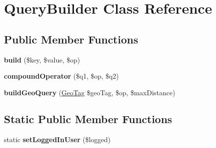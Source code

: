 \hypertarget{class_query_builder}{\section{Query\+Builder Class Reference}
\label{class_query_builder}
}
\subsection*{Public Member Functions}
\begin{DoxyCompactItemize}
\item 
\hypertarget{class_query_builder_a908461230597f7b7ca9972fc4463e98f}{{\bfseries build} (\$key, \$value, \$op)}\label{class_query_builder_a908461230597f7b7ca9972fc4463e98f}

\item 
\hypertarget{class_query_builder_a510d7ec95d940932b9218e23f46e246f}{{\bfseries compound\+Operator} (\$q1, \$op, \$q2)}\label{class_query_builder_a510d7ec95d940932b9218e23f46e246f}

\item 
\hypertarget{class_query_builder_a13d209afb6c48a39e4fcf1ad9c999a07}{{\bfseries build\+Geo\+Query} (\hyperlink{class_geo_tag}{Geo\+Tag} \$geo\+Tag, \$op, \$max\+Distance)}\label{class_query_builder_a13d209afb6c48a39e4fcf1ad9c999a07}

\end{DoxyCompactItemize}
\subsection*{Static Public Member Functions}
\begin{DoxyCompactItemize}
\item 
\hypertarget{class_query_builder_a37820d07167f942e0315ce7998a6a47f}{static {\bfseries set\+Logged\+In\+User} (\$logged)}\label{class_query_builder_a37820d07167f942e0315ce7998a6a47f}

\end{DoxyCompactItemize}
